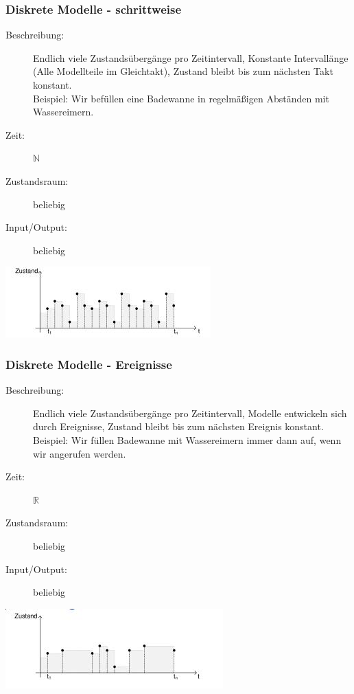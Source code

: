 \documentclass[11pt, fleqn, a4paper, leqno]{scrartcl} %
\begin{document}
		\subsubsection{Diskrete Modelle - schrittweise}
			\begin{description}
				\item[Beschreibung:] Endlich viele Zustandsübergänge pro Zeitintervall, Konstante Intervallänge (Alle Modellteile im Gleichtakt), Zustand bleibt bis zum nächsten Takt konstant.\\
				Beispiel: Wir befüllen eine Badewanne in regelmäßigen Abständen mit Wassereimern.
				
				\newpage
				
				\item[Zeit:]$\mathds{N}$
				\item[Zustandsraum:] beliebig
				\item[Input/Output:] beliebig
			\end{description}
			\begin{center}
				\includegraphics [scale=0.6]{images/diskret-schrittweise.jpg}
			\end{center}
		\subsubsection{Diskrete Modelle - Ereignisse}
			\begin{description}
				\item[Beschreibung:] Endlich viele Zustandsübergänge pro Zeitintervall, Modelle entwickeln sich durch Ereignisse, Zustand bleibt bis zum nächsten Ereignis konstant.\\
				Beispiel: Wir füllen Badewanne mit Wassereimern immer dann auf, wenn wir angerufen werden.
				\item[Zeit:] $\mathds{R}$
				\item[Zustandsraum:] beliebig
				\item[Input/Output:] beliebig
			\end{description}
			\begin{center}
				\includegraphics [scale=0.6]{images/diskret-ereignisse.jpg}
			\end{center}
\end{document}
